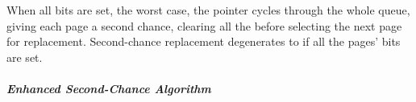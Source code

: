 When all bits are set, the worst case, the pointer cycles through the whole queue, giving each page a second chance, clearing all the  before selecting the next page for replacement.
Second-chance replacement degenerates to  if all the pages' bits are set.

\subparagraph{Enhanced Second-Chance Algorithm}\label{subpar:Enhanced_Second_Chance_Algorithm}

